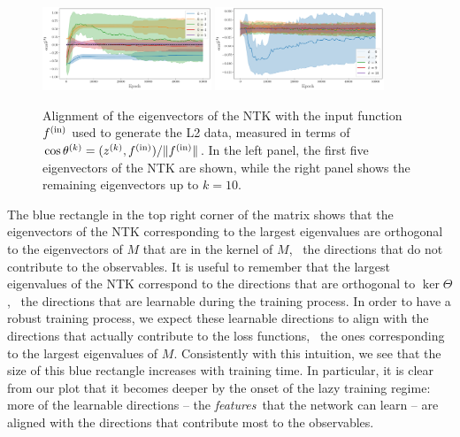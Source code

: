 \begin{figure}[ht!]
  \centering
  \includegraphics[width=0.45\textwidth]{plots/ntk_pheno/ntk_align_fin_1_L2}
  \includegraphics[width=0.45\textwidth]{plots/ntk_pheno/ntk_align_fin_2_L2}
  \caption{Alignment of the eigenvectors of the NTK with the input function
  $f^{\rm(in)}$ used to generate the L2 data, measured in terms of $\cos
  \theta^{(k)} = (z^{(k)}, f^{\rm{(in)}})/ \Vert f^{\rm{(in)}}\Vert$. In the left
  panel, the first five eigenvectors of the NTK are shown, while the right panel
  shows the remaining eigenvectors up to $k=10$.}
  \label{fig:NtkAlignFin}
\end{figure}
The blue rectangle in the top right corner of the matrix shows that the eigenvectors
of the NTK corresponding to the largest eigenvalues are orthogonal to the eigenvectors
of $M$ that are in the kernel of $M$, \ie\ the directions that do not contribute to the 
observables. It is useful to remember that the largest eigenvalues of the NTK correspond 
to the directions that are orthogonal to $\ker\Theta$, \ie\ the directions that are learnable
during the training process. In order to have a robust training process, we expect these 
learnable directions to align with the directions that actually contribute to the loss 
functions, \ie\ the ones corresponding to the largest eigenvalues of $M$. Consistently with 
this intuition, we see that the size of this blue rectangle increases with training time. 
In particular, it is clear from our plot that it becomes deeper by the onset of the lazy 
training regime: more of the learnable directions -- the {\it features}\ that the network 
can learn -- are aligned with the directions that contribute most to the observables. 

\FloatBarrier
